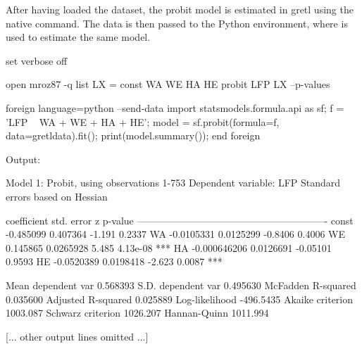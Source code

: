 After having loaded the dataset, the probit model is estimated in
gretl using the native  command. The data is then passed
to the Python environment, where  is used to estimate
the same model.

\begin{script}[htbp]
\begin{scode}
set verbose off

open mroz87 -q
list LX = const WA WE HA HE
probit LFP LX --p-values

foreign language=python --send-data
	import statsmodels.formula.api as sf;
	f = 'LFP ~ WA + WE + HA + HE';
	model = sf.probit(formula=f, data=gretldata).fit();
	print(model.summary());
end foreign
\end{scode}
  Output:
\begin{outbit}
Model 1: Probit, using observations 1-753
Dependent variable: LFP
Standard errors based on Hessian

             coefficient    std. error      z       p-value 
  ----------------------------------------------------------
  const      -0.485099      0.407364     -1.191     0.2337  
  WA         -0.0105331     0.0125299    -0.8406    0.4006  
  WE          0.145865      0.0265928     5.485     4.13e-08 ***
  HA         -0.000646206   0.0126691    -0.05101   0.9593  
  HE         -0.0520389     0.0198418    -2.623     0.0087   ***

Mean dependent var   0.568393   S.D. dependent var   0.495630
McFadden R-squared   0.035600   Adjusted R-squared   0.025889
Log-likelihood      -496.5435   Akaike criterion     1003.087
Schwarz criterion    1026.207   Hannan-Quinn         1011.994

[... other output lines omitted ...]
  

\end{outbit}
\end{script}
